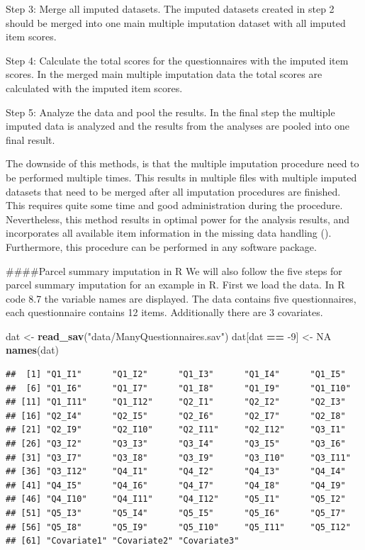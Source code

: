 \documentclass[
]{book}
\newenvironment{Shaded}{\begin{snugshade}}{\end{snugshade}}
\newcommand{\DecValTok}[1]{\textcolor[rgb]{0.00,0.00,0.81}{#1}}
\newcommand{\KeywordTok}[1]{\textcolor[rgb]{0.13,0.29,0.53}{\textbf{#1}}}
\newcommand{\NormalTok}[1]{#1}
\newcommand{\OperatorTok}[1]{\textcolor[rgb]{0.81,0.36,0.00}{\textbf{#1}}}
\newcommand{\OtherTok}[1]{\textcolor[rgb]{0.56,0.35,0.01}{#1}}
\newcommand{\StringTok}[1]{\textcolor[rgb]{0.31,0.60,0.02}{#1}}
\begin{document}
Step 3: Merge all imputed datasets. The imputed datasets created in step 2 should be merged into one main multiple imputation dataset with all imputed item scores.

Step 4: Calculate the total scores for the questionnaires with the imputed item scores. In the merged main multiple imputation data the total scores are calculated with the imputed item scores.

Step 5: Analyze the data and pool the results. In the final step the multiple imputed data is analyzed and the results from the analyses are pooled into one final result.

The downside of this methods, is that the multiple imputation procedure need to be performed multiple times. This results in multiple files with multiple imputed datasets that need to be merged after all imputation procedures are finished. This requires quite some time and good administration during the procedure. Nevertheless, this method results in optimal power for the analysis results, and incorporates all available item information in the missing data handling (\citet{Eekhout2018}). Furthermore, this procedure can be performed in any software package.

\#\#\#\#Parcel summary imputation in R
We will also follow the five steps for parcel summary imputation for an example in R. First we load the data. In R code 8.7 the variable names are displayed. The data contains five questionnaires, each questionnaire contains 12 items. Additionally there are 3 covariates.

\begin{Shaded}
\begin{Highlighting}[]
\NormalTok{dat <-}\StringTok{ }\KeywordTok{read_sav}\NormalTok{(}\StringTok{"data/ManyQuestionnaires.sav"}\NormalTok{)}
\NormalTok{dat[dat }\OperatorTok{==}\StringTok{ }\DecValTok{-9}\NormalTok{] <-}\StringTok{ }\OtherTok{NA}
\KeywordTok{names}\NormalTok{(dat)}
\end{Highlighting}
\end{Shaded}

\begin{verbatim}
##  [1] "Q1_I1"      "Q1_I2"      "Q1_I3"      "Q1_I4"      "Q1_I5"     
##  [6] "Q1_I6"      "Q1_I7"      "Q1_I8"      "Q1_I9"      "Q1_I10"    
## [11] "Q1_I11"     "Q1_I12"     "Q2_I1"      "Q2_I2"      "Q2_I3"     
## [16] "Q2_I4"      "Q2_I5"      "Q2_I6"      "Q2_I7"      "Q2_I8"     
## [21] "Q2_I9"      "Q2_I10"     "Q2_I11"     "Q2_I12"     "Q3_I1"     
## [26] "Q3_I2"      "Q3_I3"      "Q3_I4"      "Q3_I5"      "Q3_I6"     
## [31] "Q3_I7"      "Q3_I8"      "Q3_I9"      "Q3_I10"     "Q3_I11"    
## [36] "Q3_I12"     "Q4_I1"      "Q4_I2"      "Q4_I3"      "Q4_I4"     
## [41] "Q4_I5"      "Q4_I6"      "Q4_I7"      "Q4_I8"      "Q4_I9"     
## [46] "Q4_I10"     "Q4_I11"     "Q4_I12"     "Q5_I1"      "Q5_I2"     
## [51] "Q5_I3"      "Q5_I4"      "Q5_I5"      "Q5_I6"      "Q5_I7"     
## [56] "Q5_I8"      "Q5_I9"      "Q5_I10"     "Q5_I11"     "Q5_I12"    
## [61] "Covariate1" "Covariate2" "Covariate3"
\end{verbatim}
\end{document}
